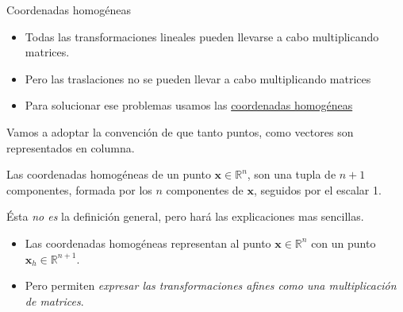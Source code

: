 \begin{frame}{Coordenadas homogéneas}

\begin{itemize}
    \item Todas las transformaciones lineales pueden llevarse a cabo multiplicando matrices.
    \item Pero las traslaciones no se pueden llevar a cabo multiplicando matrices
    \item Para solucionar ese problemas usamos las \href{https://en.wikipedia.org/wiki/Homogeneous_coordinates}{coordenadas homogéneas}
\end{itemize}
Vamos a adoptar la convención de que tanto puntos, como vectores son representados en columna.
\begin{block}{}
    Las coordenadas homogéneas de un punto $\mathbf{x} \in \mathbb{R}^n$, son una tupla de $n+1$ componentes, formada por los $n$ componentes de $\mathbf{x}$, seguidos por el escalar 1.
\end{block}
Ésta \emph{no es} la definición general, pero hará las explicaciones mas sencillas.
\begin{itemize}
    \item Las coordenadas homogéneas representan al punto $\mathbf{x} \in \mathbb{R}^n$ con un punto $\mathbf{x}_{h} \in \mathbb{R}^{n+1}$.
    \item Pero permiten \emph{expresar las transformaciones afines como una multiplicación de matrices}.
\end{itemize}

\end{frame}

